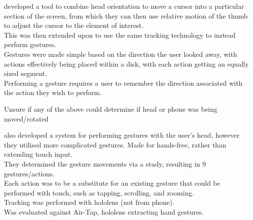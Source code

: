 \cite{voelker2020headreach} developed a tool to combine head orientation to move a cursor into a particular section of the screen, from which they can then use relative motion of the thumb to adjust the cursor to the element of interest.\\

This was then extended upon \citep{hueber2020headbang} to use the same tracking technology to instead perform gestures.\\
Gestures were made simple based on the direction the user looked away, with actions effectively being placed within a disk, with each action getting an equally sized segment.\\
Performing a gesture requires a user to remember the direction associated with the action they wish to perform.

Unsure if any of the above could determine if head or phone was being moved/rotated

\cite{yan2018headgesture} also developed a system for performing gestures with the user's head, however they utilised more complicated gestures. Made for hands-free, rather than extending touch input.\\
They determined the gesture movements via a study, resulting in 9 gestures/actions.\\
Each action was to be a substitute for an existing gesture that could be performed with touch, such as tapping, scrolling, and zooming.\\
Tracking was performed with hololens (not from phone).\\
Was evaluated against Air-Tap, hololens extracting hand gestures.


